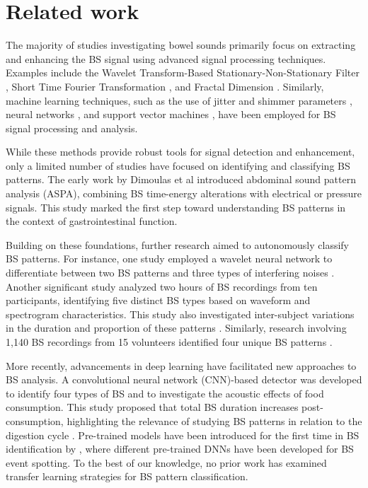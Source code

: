 \section{Related work}
 The majority of studies investigating bowel sounds primarily focus on extracting and enhancing the BS signal using advanced signal processing techniques. Examples include the Wavelet Transform-Based Stationary-Non-Stationary Filter \cite{hadjileontiadis1999,liatsos2003}, Short Time Fourier Transformation \cite{ficek2021}, and Fractal Dimension \cite{dimoulas2007}. Similarly, machine learning techniques, such as the use of jitter and shimmer parameters \cite{kim2011}, neural networks \cite{yin2015,kim22011}, and support vector machines \cite{yin2018}, have been employed for BS signal processing and analysis.

While these methods provide robust tools for signal detection and enhancement, only a limited number of studies have focused on identifying and classifying BS patterns. The early work by Dimoulas et al \cite{dimoulas2003} introduced abdominal sound pattern analysis (ASPA), combining BS time-energy alterations with electrical or pressure signals. This study marked the first step toward understanding BS patterns in the context of gastrointestinal function.

Building on these foundations, further research aimed to autonomously classify BS patterns. For instance, one study employed a wavelet neural network to differentiate between two BS patterns and three types of interfering noises \cite{dimoulas2007}. Another significant study analyzed two hours of BS recordings from ten participants, identifying five distinct BS types based on waveform and spectrogram characteristics. This study also investigated inter-subject variations in the duration and proportion of these patterns \cite{du2018}. Similarly, research involving 1,140 BS recordings from 15 volunteers identified four unique BS patterns \cite{Zhang2024}.

More recently, advancements in deep learning have facilitated new approaches to BS analysis. A convolutional neural network (CNN)-based detector was developed to identify four types of BS and to investigate the acoustic effects of food consumption. This study proposed that total BS duration increases post-consumption, highlighting the relevance of studying BS patterns in relation to the digestion cycle \cite{wang2022}.
Pre-trained models have been introduced for the first time in BS identification by \cite{Baronetto2023}, where different pre-trained DNNs have been developed for BS event spotting. To the best of our knowledge, no prior work has examined transfer learning strategies for BS pattern classification.